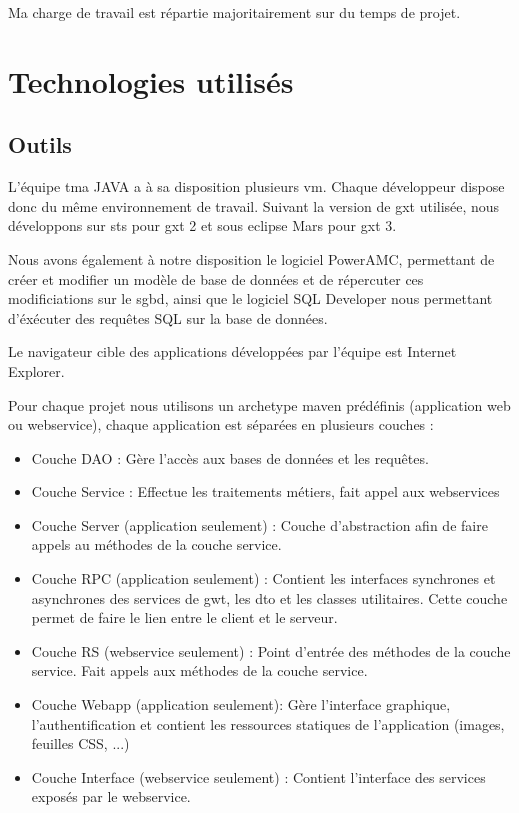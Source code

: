 \documentclass[12pt]{report}
\begin{document}
    Ma charge de travail est répartie majoritairement sur du temps de projet.
    
    \section{Technologies utilisés}
    
    \subsection{Outils}
    L'équipe \gls{tma} JAVA a à sa disposition plusieurs \gls{vm}. Chaque développeur dispose donc du même environnement de travail. Suivant la version de \gls{gxt} utilisée, nous développons sur \gls{sts} pour \gls{gxt} 2 et sous \gls{eclipse} Mars pour \gls{gxt} 3.
    
    Nous avons également à notre disposition le logiciel PowerAMC, permettant de créer et modifier un modèle de base de données et de répercuter ces modificiations sur le \gls{sgbd}, ainsi que le logiciel SQL Developer nous permettant d'éxécuter des requêtes SQL sur la base de données. 
    
    Le navigateur cible des applications développées par l'équipe est Internet Explorer.
    
    \newpage
    
    Pour chaque projet nous utilisons un archetype \gls{maven} prédéfinis (application web ou \gls{webservice}), chaque application est séparées en plusieurs couches :\vspace{-1em}
    \begin{itemize}[itemsep=0em]
        \item Couche DAO : Gère l'accès aux bases de données et les requêtes.
        \item Couche Service : Effectue les traitements métiers, fait appel aux \glspl{webservice}
        \item Couche Server (application seulement) : Couche d'abstraction afin de faire appels au méthodes de la couche service.
        \item Couche RPC (application seulement) : Contient les interfaces synchrones et asynchrones des services de \gls{gwt}, les \gls{dto} et les classes utilitaires. Cette couche permet de faire le lien entre le client et le serveur.
        \item Couche RS (\gls{webservice} seulement) : Point d'entrée des méthodes de la couche service. Fait appels aux méthodes de la couche service.
        \item Couche Webapp (application seulement): Gère l'interface graphique, l'authentification et contient les ressources statiques de l'application (images, feuilles CSS, ...)
        \item Couche Interface (\gls{webservice} seulement) : Contient l'interface des services exposés par le \gls{webservice}.
    \end{itemize}\vspace{-0.5em}
    
\end{document}
